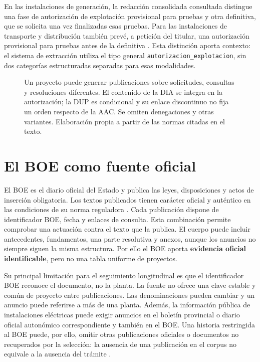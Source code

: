 En las instalaciones de generación, la redacción consolidada consultada
distingue una fase de autorización de explotación provisional para pruebas y
otra definitiva, que se solicita una vez finalizadas esas pruebas. Para las
instalaciones de transporte y distribución también prevé, a petición del
titular, una autorización provisional para pruebas antes de la definitiva
\cite{ministeriodeeconomia_realdecreto1955_2000}.
Esta distinción aporta contexto: el sistema de extracción utiliza el tipo
general \texttt{autorizacion\_explotacion}, sin dos categorías estructuradas
separadas para esas modalidades.

\begin{figure}[p]
\centering

\caption[Procedimiento administrativo simplificado]{Un proyecto puede
generar publicaciones sobre solicitudes, consultas y resoluciones diferentes.
El contenido de la DIA se integra en la autorización; la DUP es condicional y
su enlace discontinuo no fija un orden respecto de la AAC. Se omiten
denegaciones y otras variantes. Elaboración propia a partir de las normas
citadas en el texto.}
\label{fig:procedimiento-administrativo}
\end{figure}

\section{El BOE como fuente oficial}
\label{sec:boe-api-concepto}
El BOE es el diario oficial del Estado y publica las leyes, disposiciones y
actos de inserción obligatoria. Los textos publicados tienen carácter oficial
y auténtico en las condiciones de su norma reguladora
\cite{ministeriopresidencia_realdecreto181_2008}.
Cada publicación dispone de identificador BOE, fecha y enlaces de consulta.
Esta combinación permite comprobar una actuación contra el texto que la
publica. El cuerpo puede incluir antecedentes, fundamentos, una parte
resolutiva y anexos, aunque los anuncios no siempre siguen la misma estructura.
Por ello el BOE aporta \textbf{evidencia oficial identificable}, pero no una
tabla uniforme de proyectos.

Su principal limitación para el seguimiento longitudinal es que el
identificador BOE reconoce el documento, no la planta. La fuente no ofrece una
clave estable y común de proyecto entre publicaciones. Las denominaciones
pueden cambiar y un anuncio puede referirse a más de una planta. Además, la
información pública de instalaciones eléctricas puede exigir anuncios en el
boletín provincial o diario oficial autonómico correspondiente y también en
el BOE. Una historia restringida al BOE puede, por ello, omitir otras
publicaciones oficiales o documentos no recuperados por la selección: la
ausencia de una publicación en el corpus no equivale a la ausencia del trámite
\cite{ministeriodeeconomia_realdecreto1955_2000}.


